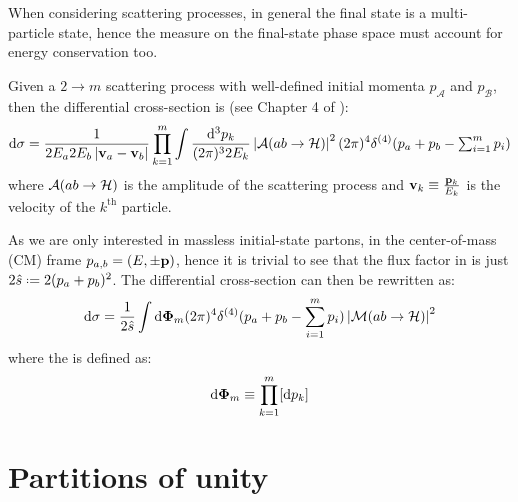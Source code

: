 When considering scattering processes, in general the final state is a multi-particle state, hence the measure on the final-state phase space must account for energy conservation too.

Given a $ 2 \rightarrow m $ scattering process with well-defined initial momenta $ p_\mathcal{A} $ and $ p_\mathcal{B} $, then the differential cross-section is (see Chapter 4 of \cite{Peskin-1995}):
\begin{equation}
  \mathrm{d}\sigma = \frac{1}{2E_a 2E_b \left\lvert\mathbf{v}_a - \mathbf{v}_b\right\rvert} \prod_{k = 1}^m \int \frac{\mathrm{d}^3p_k}{(2\pi)^3 2E_k} \left\lvert\mathcal{A}(ab \rightarrow \mathcal{H})\right\rvert^2 (2\pi)^4 \delta^{(4)}(p_a + p_b - \textstyle\sum_{i = 1}^m p_i)
  \label{eq:scatt-cr-sec}
\end{equation}
where $ \mathcal{A}(ab \rightarrow \mathcal{H}) $ is the amplitude of the scattering process and $ \mathbf{v}_k \equiv \frac{\mathbf{p}_k}{E_k} $ is the velocity of the $ k^\text{th} $ particle.

As we are only interested in massless initial-state partons, in the center-of-mass (CM) frame $ p_{a,b} = (E, \pm\mathbf{p}) $, hence it is trivial to see that the flux factor in  is just $ 2\hat{s} \defeq 2 (p_a + p_b)^2 $. The differential cross-section can then be rewritten as:
\begin{equation}
  \mathrm{d} \sigma = \frac{1}{2\hat{s}} \int \mathrm{d} \boldsymbol{\Phi}_m (2\pi)^4 \delta^{(4)}(p_a + p_b - \sum_{i = 1}^m p_i) \left\lvert\mathcal{M}(ab \rightarrow \mathcal{H})\right\rvert^2
\end{equation}
where the  is defined as:
\begin{equation}
  \mathrm{d} \boldsymbol{\Phi}_m \equiv \prod_{k = 1}^m [\mathrm{d} p_k]
\end{equation}

\section{Partitions of unity}
\label{sec:unit-part}

